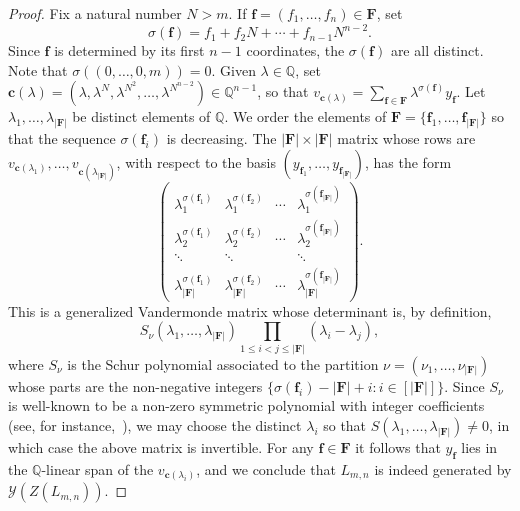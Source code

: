 \documentclass[11pt,a4paper]{amsart}
\theoremstyle{plain}
\theoremstyle{remark}
\newcommand{\Q}{\mathbb{Q}}
\begin{document}
\begin{proof}
Fix a natural number $N > m$.  If $\mathbf{f} = (f_1, \dots, f_n) \in \mathbf{F}$, set 
$$\sigma(\mathbf{f}) = f_1 + f_2 N + \cdots + f_{n-1} N^{n-2}.$$  
Since $\mathbf{f}$ is determined by its first $n - 1$ coordinates, the $\sigma(\mathbf{f})$ are all distinct.  Note that $\sigma((0, \dots, 0,m)) = 0$.  Given $\lambda \in \Q$, set $\mathbf{c}(\lambda) = (\lambda, \lambda^N, \lambda^{N^2}, \dots, \lambda^{N^{n-2}}) \in \Q^{n-1}$, so that $v_{\mathbf{c}(\lambda)} = \sum_{\mathbf{f} \in \mathbf{F}} \lambda^{\sigma(\mathbf{f})} y_{\mathbf{f}}$.  Let $\lambda_1, \dots, \lambda_{| \mathbf{F} |}$ be distinct elements of $\Q$.  We order the elements of $\mathbf{F} = \{ \mathbf{f}_1, \dots, \mathbf{f}_{| \mathbf{F} |} \}$ so that the sequence $\sigma(\mathbf{f}_i)$ is decreasing.  The $| \mathbf{F} | \times | \mathbf{F} |$ matrix whose rows are $v_{\mathbf{c}(\lambda_1)}, \dots, v_{\mathbf{c}(\lambda_{| \mathbf{F} |})}$, with respect to the basis $( y_{\mathbf{f}_1}, \dots, y_{\mathbf{f}_{| \mathbf{F} |}} )$, has the form
$$
\left(  \begin{array}{llcr}
\lambda_1^{\sigma(\mathbf{f}_1)} & \lambda_1^{\sigma(\mathbf{f}_2)} & \cdots & \lambda_1^{\sigma(\mathbf{f}_{| \mathbf{F} |})} \\
\lambda_2^{\sigma(\mathbf{f}_1)} & \lambda_2^{\sigma(\mathbf{f}_2)} & \cdots & \lambda_2^{\sigma(\mathbf{f}_{| \mathbf{F} |})} \\
\ddots & \ddots && \ddots \\
\lambda_{| \mathbf{F} |}^{\sigma(\mathbf{f}_1)} & \lambda_{| \mathbf{F} |}^{\sigma(\mathbf{f}_2)} & \cdots & \lambda_{| \mathbf{F} |}^{\sigma(\mathbf{f}_{| \mathbf{F} |})} \end{array} \right).
$$
This is a generalized Vandermonde matrix whose determinant is, by definition, 
$$ S_\nu(\lambda_1, \dots, \lambda_{| \mathbf{F} |}) \prod_{1 \leq i < j \leq | \mathbf{F} |} (\lambda_i - \lambda_j),$$
where $S_\nu$ is the Schur polynomial associated to the partition $\nu = (\nu_1, \dots, \nu_{| \mathbf{F} | })$ whose parts are the non-negative integers $\{ \sigma(\mathbf{f}_i) - | \mathbf{F}| + i : i \in [ | \mathbf{F} | ] \}$.  Since $S_\nu$ is well-known to be a non-zero symmetric polynomial with integer coefficients (see, for instance,~\cite[Section~I.3]{Macdonald/95}),
we may choose the distinct $\lambda_i$ so that $S(\lambda_1, \dots, \lambda_{| \mathbf{F} |}) \neq 0$, in which case the above matrix is invertible.  For any $\mathbf{f} \in \mathbf{F}$ it follows that $y_{\mathbf{f}}$ lies in the $\Q$-linear span of the $v_{\mathbf{c}(\lambda_i)}$, and we conclude that $L_{m,n}$ is indeed generated by $\mathcal{Y}(Z(L_{m,n}))$.
\end{proof}
\end{document}
